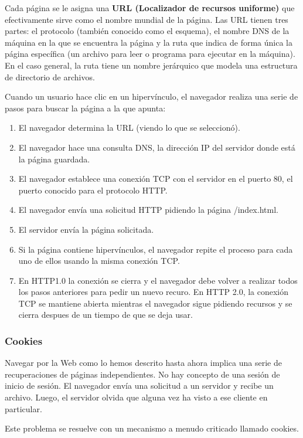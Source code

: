 Cada página se le asigna una \textbf{URL (Localizador de recursos uniforme)} que efectivamente sirve como el nombre mundial de la página. Las URL tienen tres partes: el protocolo (también conocido como el esquema), el nombre DNS de la máquina en la que se encuentra la página y la ruta que indica de forma única la página específica (un archivo para leer o programa para ejecutar en la máquina). En el caso general, la ruta tiene un nombre jerárquico que modela una estructura de directorio de archivos.

Cuando un usuario hace clic en un hipervínculo, el navegador realiza una serie de pasos para buscar la página a la que apunta:
\begin{enumerate}
  \item El navegador determina la URL (viendo lo que se seleccionó).
  \item El navegador hace una consulta DNS, la dirección IP del servidor donde está la página guardada.
  \item El navegador establece una conexión TCP con el servidor en el puerto 80, el puerto conocido para el protocolo HTTP.
  \item El navegador envía una solicitud HTTP pidiendo la página /index.html.
  \item El servidor envía la página solicitada.
  \item Si la página contiene hipervínculos, el navegador repite el proceso para cada uno de ellos usando la misma conexión TCP.
  \item En HTTP1.0 la conexión se cierra y el navegador debe volver a realizar todos los pasos anteriores para pedir un nuevo recuro. En HTTP 2.0, la conexión TCP se mantiene abierta mientras el navegador sigue pidiendo recursos y se cierra despues de un tiempo de que se deja usar.
\end{enumerate}

\subsubsection{Cookies}
Navegar por la Web como lo hemos descrito hasta ahora implica una serie de recuperaciones de páginas independientes. No hay concepto de una sesión de inicio de sesión. El navegador envía una solicitud a un servidor y recibe un archivo. Luego, el servidor olvida que alguna vez ha visto a ese cliente en particular.

Este problema se resuelve con un mecanismo a menudo criticado llamado cookies.


